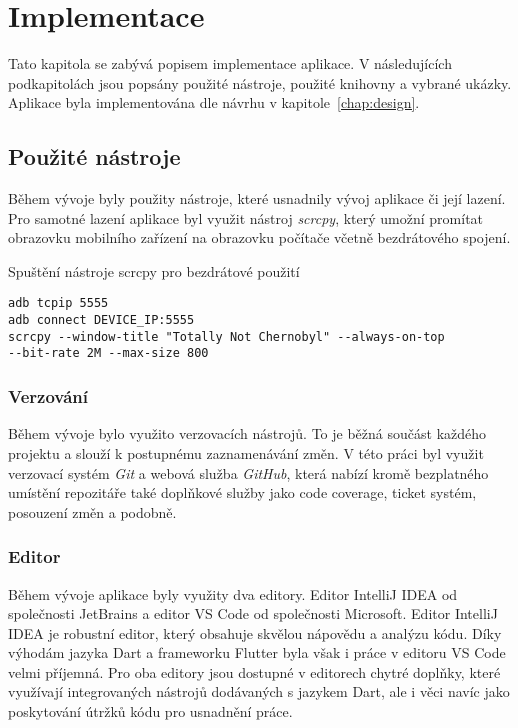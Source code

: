 \chapter{Implementace}
\label{chap:implementation}

Tato kapitola se zabývá popisem implementace aplikace.
V následujících podkapitolách jsou popsány použité nástroje,
použité knihovny a vybrané ukázky.
Aplikace byla implementována dle návrhu v kapitole~\ref{chap:design}.

\section{Použité nástroje}

Během vývoje byly použity nástroje,
které usnadnily vývoj aplikace či její lazení.
Pro samotné lazení aplikace byl využit nástroj \emph{scrcpy},
který umožní promítat obrazovku mobilního zařízení na obrazovku počítače
včetně bezdrátového spojení.

\begin{listing}
    \caption{Spuštění nástroje scrcpy pro bezdrátové použití}
    \label{code:scrcpy}
    \begin{verbatim}
adb tcpip 5555
adb connect DEVICE_IP:5555
scrcpy --window-title "Totally Not Chernobyl" --always-on-top
--bit-rate 2M --max-size 800
    \end{verbatim}
\end{listing}

\subsection{Verzování}

Během vývoje bylo využito verzovacích nástrojů.
To je běžná součást každého projektu a slouží k postupnému zaznamenávání změn.
V této práci byl využit verzovací systém \emph{Git} a webová služba \emph{GitHub},
která nabízí kromě bezplatného umístění repozitáře také doplňkové služby jako
code coverage, ticket systém, posouzení změn a podobně.

\subsection{Editor}

Během vývoje aplikace byly využity dva editory.
Editor IntelliJ IDEA od společnosti JetBrains
a editor VS Code od společnosti Microsoft.
Editor IntelliJ IDEA je robustní editor,
který obsahuje skvělou nápovědu a analýzu kódu.
Díky výhodám jazyka Dart a frameworku Flutter
byla však i práce v editoru VS Code velmi příjemná.
Pro oba editory jsou dostupné v editorech chytré doplňky,
které využívají integrovaných nástrojů dodávaných s jazykem Dart,
ale i věci navíc jako poskytování útržků kódu pro usnadnění práce.

